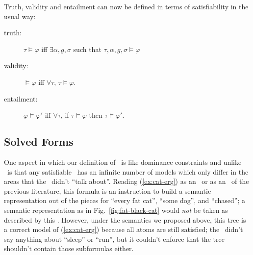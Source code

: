 Truth, validity and entailment can now be defined in terms of
satisfiability in the usual way:
\begin{definition}\label{defn:entailment}
\begin{description}
\item   [truth:] $\tau\models \varphi$ iff $\exists \alpha,g,\sigma$  such
  that $\tau,\alpha,g,\sigma\models \varphi$
\item   [validity:] $\models \varphi$ iff $\forall \tau$, $\tau\models \varphi$.
\item   [entailment:] $\varphi\models \varphi'$ iff $\forall \tau$, if
  $\tau\models \varphi$ then $\tau\models \varphi'$.
\end{description}
\end{definition}



\subsection{Solved Forms}

One aspect in which our definition of \rmrs\ is like dominance
constraints and unlike \mrs\ is that any satisfiable \rmrs\ has an
infinite number of models which only differ in the areas that the
\rmrs\ didn't ``talk about''.  Reading (\ref{ex:cat-erg})
as an \mrs\ or as an \rmrs\ of the previous literature, this
formula is an instruction to build a semantic representation out of
the pieces for ``every fat cat'', ``some dog'', and ``chased''; a
semantic representation as in Fig.~\ref{fig:fat-black-cat} would
\emph{not} be taken as described by this \rmrs.  However, under the
semantics we proposed above, this tree is a correct model of
(\ref{ex:cat-erg}) because all atoms are still satisfied; the \rmrs\
didn't say anything about ``sleep'' or ``run'', but it couldn't
enforce that the tree shouldn't contain those subformulas either.

